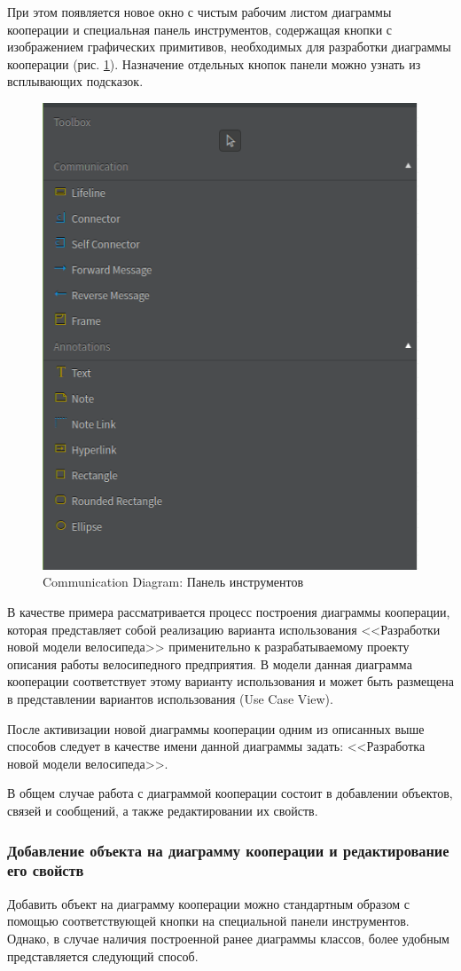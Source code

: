 \documentclass[a4paper,12pt]{extreport}
\begin{document}
При этом появляется новое окно с чистым рабочим листом диаграммы кооперации и специальная панель инструментов, содержащая кнопки с изображением графических примитивов, необходимых для разработки диаграммы кооперации (рис. \ref{fig:toolboxcommunication}).  Назначение отдельных кнопок панели можно узнать из всплывающих подсказок.

\begin{figure}[h!]
	\centering
	\includegraphics[width=0.5\linewidth]{images/toolboxcommunication}
	\caption{Communication Diagram: Панель инструментов}
	\label{fig:toolboxcommunication}
\end{figure}

В качестве примера рассматривается процесс построения диаграммы кооперации, которая представляет собой реализацию варианта использования <<Разработки новой модели велосипеда>> применительно к разрабатываемому проекту описания работы велосипедного предприятия. В модели данная диаграмма кооперации соответствует этому варианту использования и может быть размещена в представлении вариантов использования (Use Case View).

После активизации новой диаграммы кооперации одним из описанных выше способов следует в качестве имени данной диаграммы задать: <<Разработка новой модели велосипеда>>.

В общем случае работа с диаграммой кооперации состоит в добавлении объектов, связей и сообщений, а также редактировании их свойств.
\subsubsection*{Добавление объекта на диаграмму кооперации и редактирование его свойств}
Добавить объект на диаграмму кооперации можно стандартным образом с помощью соответствующей кнопки на специальной панели инструментов. Однако, в случае наличия построенной ранее диаграммы классов, более удобным представляется следующий способ. 
\end{document}
